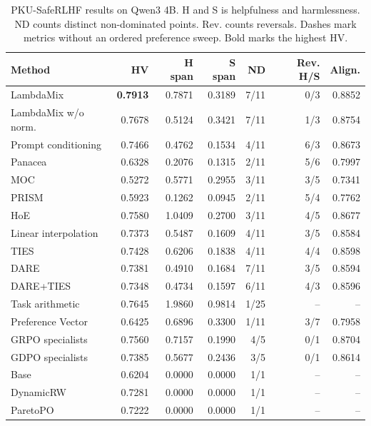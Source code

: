 \begin{table}[htbp]
\centering\small
\setlength{\tabcolsep}{3pt}
\caption{PKU-SafeRLHF results on Qwen3 4B. H and S is helpfulness and harmlessness. ND counts distinct non-dominated points. Rev. counts reversals. Dashes mark metrics without an ordered preference sweep. Bold marks the highest HV.}
\label{tab:full-pku-q4}
\begin{tabular}{@{}lrrrrrr@{}}
\toprule
Method & HV & H span & S span & ND & Rev. H/S & Align.\\
\midrule
LambdaMix & \textbf{0.7913} & 0.7871 & 0.3189 & 7/11 & 0/3 & 0.8852\\
LambdaMix w/o norm. & 0.7678 & 0.5124 & 0.3421 & 7/11 & 1/3 & 0.8754\\
\midrule
Prompt conditioning & 0.7466 & 0.4762 & 0.1534 & 4/11 & 6/3 & 0.8673\\
Panacea & 0.6328 & 0.2076 & 0.1315 & 2/11 & 5/6 & 0.7997\\
MOC & 0.5272 & 0.5771 & 0.2955 & 3/11 & 3/5 & 0.7341\\
PRISM & 0.5923 & 0.1262 & 0.0945 & 2/11 & 5/4 & 0.7762\\
HoE & 0.7580 & 1.0409 & 0.2700 & 3/11 & 4/5 & 0.8677\\
\midrule
Linear interpolation & 0.7373 & 0.5487 & 0.1609 & 4/11 & 3/5 & 0.8584\\
TIES & 0.7428 & 0.6206 & 0.1838 & 4/11 & 4/4 & 0.8598\\
DARE & 0.7381 & 0.4910 & 0.1684 & 7/11 & 3/5 & 0.8594\\
DARE+TIES & 0.7348 & 0.4734 & 0.1597 & 6/11 & 4/3 & 0.8596\\
Task arithmetic & 0.7645 & 1.9860 & 0.9814 & 1/25 & -- & --\\
Preference Vector & 0.6425 & 0.6896 & 0.3300 & 1/11 & 3/7 & 0.7958\\
\midrule
GRPO specialists & 0.7560 & 0.7157 & 0.1990 & 4/5 & 0/1 & 0.8704\\
GDPO specialists & 0.7385 & 0.5677 & 0.2436 & 3/5 & 0/1 & 0.8614\\
\midrule
Base & 0.6204 & 0.0000 & 0.0000 & 1/1 & -- & --\\
DynamicRW & 0.7281 & 0.0000 & 0.0000 & 1/1 & -- & --\\
ParetoPO & 0.7222 & 0.0000 & 0.0000 & 1/1 & -- & --\\
\bottomrule
\end{tabular}
\end{table}

